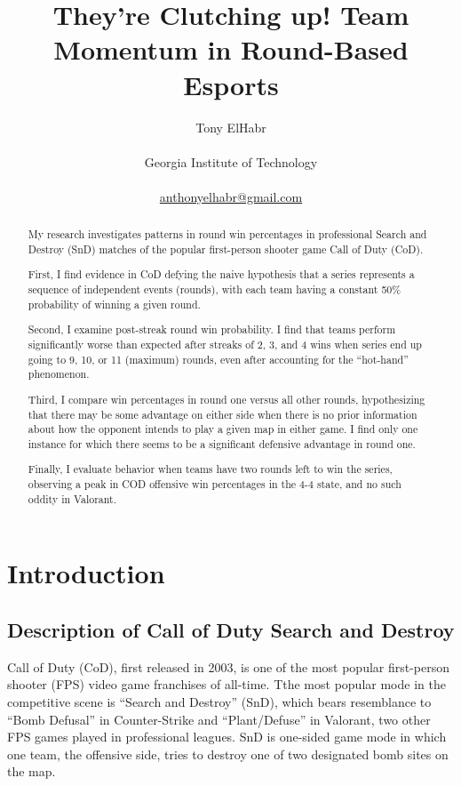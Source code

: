\documentclass[
]{article}
\title{They're Clutching up! Team Momentum in Round-Based Esports}
\author{
Tony ElHabr\\\\Georgia Institute of
Technology\\\\\href{mailto:anthonyelhabr@gmail.com}{anthonyelhabr@gmail.com}}
\date{}
\begin{document}
\maketitle
\begin{abstract}
My research investigates patterns in round win percentages in
professional Search and Destroy (SnD) matches of the popular
first-person shooter game Call of Duty (CoD).

First, I find evidence in CoD defying the naive hypothesis that a series
represents a sequence of independent events (rounds), with each team
having a constant 50\% probability of winning a given round.

Second, I examine post-streak round win probability. I find that teams
perform significantly worse than expected after streaks of 2, 3, and 4
wins when series end up going to 9, 10, or 11 (maximum) rounds, even
after accounting for the ``hot-hand'' phenomenon.

Third, I compare win percentages in round one versus all other rounds,
hypothesizing that there may be some advantage on either side when there
is no prior information about how the opponent intends to play a given
map in either game. I find only one instance for which there seems to be
a significant defensive advantage in round one.

Finally, I evaluate behavior when teams have two rounds left to win the
series, observing a peak in COD offensive win percentages in the 4-4
state, and no such oddity in Valorant.
\end{abstract}
\ifdefined\Shaded\renewenvironment{Shaded}{\begin{tcolorbox}[borderline west={3pt}{0pt}{shadecolor}, sharp corners, interior hidden, enhanced, breakable, frame hidden, boxrule=0pt]}{\end{tcolorbox}}\fi

\hypertarget{introduction}{%
\section{Introduction}\label{introduction}}

\hypertarget{description-of-call-of-duty-search-and-destroy}{%
\subsection{Description of Call of Duty Search and
Destroy}\label{description-of-call-of-duty-search-and-destroy}}

Call of Duty (CoD), first released in 2003, is one of the most popular
first-person shooter (FPS) video game franchises of all-time. Tthe most
popular mode in the competitive scene is ``Search and Destroy'' (SnD),
which bears resemblance to ``Bomb Defusal'' in Counter-Strike and
``Plant/Defuse'' in Valorant, two other FPS games played in professional
leagues. SnD is one-sided game mode in which one team, the offensive
side, tries to destroy one of two designated bomb sites on the map.
\end{document}
